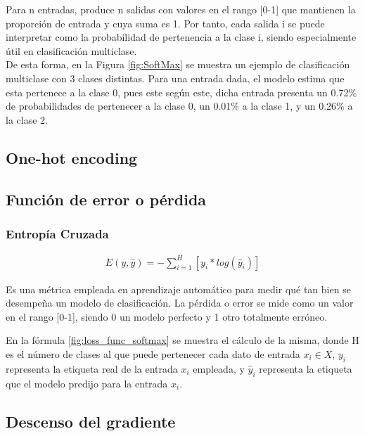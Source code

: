 Para n entradas, produce n salidas con valores en el rango [0-1] que mantienen la proporción de entrada y cuya suma es 1. Por tanto, cada salida i se puede interpretar como la probabilidad de pertenencia a la clase i, siendo especialmente útil en clasificación multiclase. \cite{SoftMax_MLM} \\
De esta forma, en la Figura \ref{fig:SoftMax} se muestra un ejemplo de clasificación multiclase con 3 clases distintas. Para una entrada dada, el modelo estima que esta pertenece a la clase 0, pues este según este, dicha entrada presenta un 0.72\% de probabilidades de pertenecer a la clase 0, un 0.01\% a la clase 1, y un 0.26\% a la clase 2.

\subsection{One-hot encoding}

\subsection{Función de error o pérdida}

\subsubsection{Entropía Cruzada}

\begin{gather}
	E(y, \hat{y}) = - \sum_{i=1}^{H}  [y_i * log( \hat{y}_i)]
	\label{fig:loss_func_softmax}
\end{gather}

Es una métrica empleada en aprendizaje automático para medir qué tan bien se desempeña un modelo de clasificación. La pérdida o error se mide como un valor en el rango [0-1], siendo 0 un modelo perfecto y 1 otro totalmente erróneo. \cite{Cross_entropy}

En la fórmula \ref{fig:loss_func_softmax} se muestra el cálculo de la misma, donde H es el número de clases al que puede pertenecer cada dato de entrada $x_i \in X$, $y_i$ representa la etiqueta real de la entrada $x_i$ empleada, y $\hat{y}_i$ representa la etiqueta que el modelo predijo para la entrada $x_i$. 


\subsection{Descenso del gradiente}

